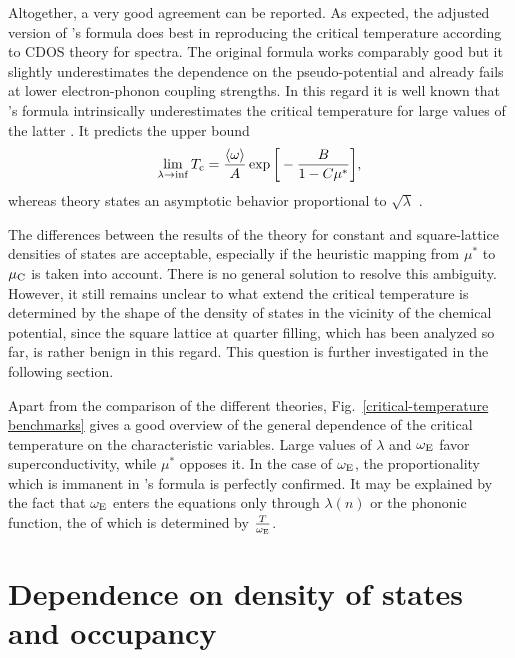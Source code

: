 Altogether, a very good agreement can be reported. As expected, the adjusted
version of 's formula does best in reproducing the critical
temperature according to CDOS  theory for 
spectra. The original formula works comparably good but it slightly
underestimates the dependence on the  pseudo-potential and already
fails at lower electron-phonon coupling strengths. In this regard it is well
known that 's formula intrinsically underestimates the critical
temperature for large values of the latter \cite{AllenDynes75}. It predicts the
upper bound
%
\begin{equation*}
    \lim_{\lambda \rightarrow \inf} T \sb{\text{c}} = \frac {\langle\omega\rangle} A
    \exp \bigg[ -\frac B {1 - C \mu^*} \bigg],
\end{equation*}
%
whereas  theory states an asymptotic behavior proportional to
$\sqrt \lambda$ \cite[Eq.~3.56]{Galasso05}.

The differences between the results of the  theory for constant
and square-lattice densities of states are acceptable, especially if the
heuristic mapping from $\mu^*$ to $\mu \sb{\text{C}}$ is taken into account. There is
no general solution to resolve this ambiguity. However, it still remains unclear
to what extend the critical temperature is determined by the shape of the
density of states in the vicinity of the chemical potential, since the square
lattice at quarter filling, which has been analyzed so far, is rather benign in
this regard. This question is further investigated in the following section.

Apart from the comparison of the different theories,
Fig.~\ref{critical-temperature benchmarks} gives a good overview of the general
dependence of the critical temperature on the characteristic variables. Large
values of $\lambda$ and $\omega \sb{\text{E}}$ favor superconductivity, while $\mu^*$
opposes it. In the case of $\omega \sb{\text{E}}$, the proportionality which is
immanent in 's formula is perfectly confirmed. It may be
explained by the fact that $\omega \sb{\text{E}}$ enters the 
equations only through $\lambda(n)$ or the phononic  function, the
 of which is determined by $\frac T {\omega \sb{\text{E}}}$.

\section{Dependence on density of states and occupancy}

